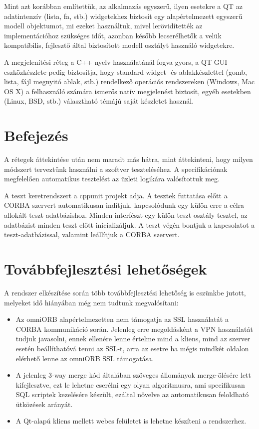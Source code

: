 \documentclass[a4paper,12pt]{article}
\begin{document}
Mint azt korábban említettük, az alkalmazás egyszerű, ilyen esetekre a QT az
adatintenzív (lista, fa, stb.) widgetekhez biztosít egy alapértelmezett egyszerű
modell objektumot, mi ezeket használtuk, mivel lerövidítették az implementációhoz
szükséges időt, azonban később lecserélhetők a velük kompatíbilis, fejlesztő által
biztosított modell osztályt használó widgetekre.

A megjelenítési réteg a C++ nyelv használatánál fogva gyors, a QT GUI eszközkészlete
pedig biztosítja, hogy standard widget- és ablakkészlettel (gomb, lista, fájl megnyitó
ablak, stb.) rendelkező operációs rendszereken (Windows, Mac OS X) a felhasználó
számára ismerős natív megjelenést biztosít, egyéb esetekben (Linux, BSD, stb.)
választható témájú saját készletet használ.

\section{Befejezés}

A rétegek áttekintése után nem maradt más hátra, mint áttekinteni, hogy milyen
módszert terveztünk használni a szoftver teszteléséhez. A specifikációnak
megfelelően automatikus tesztelést az üzleti logikára valósítottuk meg.

A teszt keretrendszert a cppunit projekt adja. A tesztek futtatása előtt a
CORBA szervert automatikusan indítjuk, kapcsolódunk egy külön erre a célra
allokált teszt adatbázishoz. Minden interfészt egy külön teszt osztály tesztel,
az adatbázist minden teszt előtt inicializáljuk. A teszt végén bontjuk a
kapcsolatot a teszt-adatbázissal, valamint leállítjuk a CORBA szervert.

\section{Továbbfejlesztési lehetőségek}

A rendszer elkészítése során több továbbfejlesztési lehetőség is eszünkbe
jutott, melyeket idő hiányában még nem tudtunk megvalósítani:

\begin{itemize}
\item Az omniORB alapértelmezetten nem támogatja az SSL használatát a CORBA
kommunikáció során. Jelenleg erre megoldásként a VPN használatát tudjuk
javasolni, ennek ellenére lenne értelme mind a kliens, mind az szerver esetén
beállíthatóvá tenni az SSL-t, arra az esetre ha mégis mindkét oldalon elérhető
lenne az omniORB SSL támogatása.
\item A jelenleg 3-way merge kód általában szöveges állományok merge-ölésére
lett kifejlesztve, ezt le lehetne cserélni egy olyan algoritmusra, ami
specifikusan SQL scriptek kezelésére készült, ezáltal növelve az automatikusan
feloldható ütközések arányát.
\item A Qt-alapú kliens mellett webes felületet is lehetne készíteni a
rendszerhez.
\end{itemize}
\end{document}
